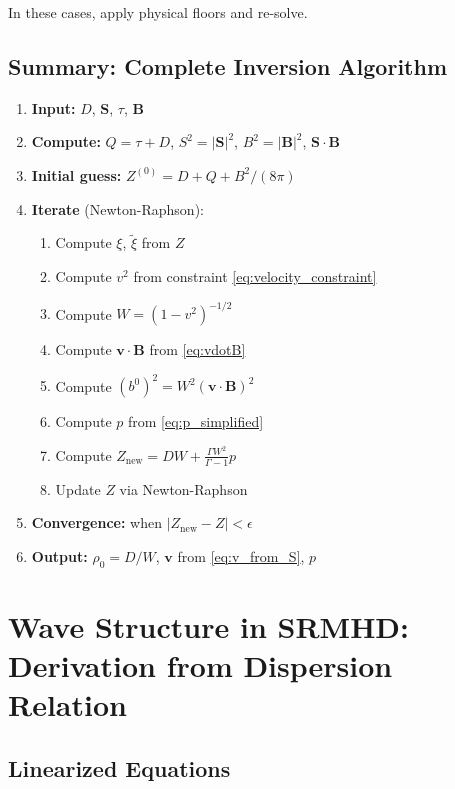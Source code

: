 \documentclass[12pt,a4paper]{article}
\begin{document}
In these cases, apply physical floors and re-solve.

\subsection{Summary: Complete Inversion Algorithm}

\begin{enumerate}
    \item \textbf{Input:} $D$, $\bm{S}$, $\tau$, $\bm{B}$
    \item \textbf{Compute:} $Q = \tau + D$, $S^2 = |\bm{S}|^2$, $B^2 = |\bm{B}|^2$, $\bm{S} \cdot \bm{B}$
    \item \textbf{Initial guess:} $Z^{(0)} = D + Q + B^2/(8\pi)$
    \item \textbf{Iterate} (Newton-Raphson):
    \begin{enumerate}
        \item Compute $\xi$, $\tilde{\xi}$ from $Z$
        \item Compute $v^2$ from constraint \eqref{eq:velocity_constraint}
        \item Compute $W = (1 - v^2)^{-1/2}$
        \item Compute $\bm{v} \cdot \bm{B}$ from \eqref{eq:vdotB}
        \item Compute $(b^0)^2 = W^2 (\bm{v} \cdot \bm{B})^2$
        \item Compute $p$ from \eqref{eq:p_simplified}
        \item Compute $Z_\text{new} = DW + \frac{\Gamma W^2}{\Gamma-1}p$
        \item Update $Z$ via Newton-Raphson
    \end{enumerate}
    \item \textbf{Convergence:} when $|Z_\text{new} - Z| < \epsilon$
    \item \textbf{Output:} $\rho_0 = D/W$, $\bm{v}$ from \eqref{eq:v_from_S}, $p$
\end{enumerate}

\section{Wave Structure in SRMHD: Derivation from Dispersion Relation}

\subsection{Linearized Equations}
\end{document}
